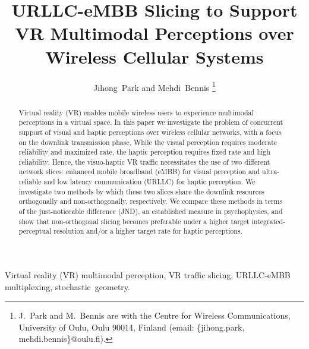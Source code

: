 \documentclass[conference]{IEEEtran}
\def\papertitle{URLLC-eMBB Slicing to Support VR Multimodal Perceptions over Wireless Cellular Systems}
\begin{document}
\title{ \fontsize{24}{28}\selectfont  \papertitle}

\author{Jihong~Park and Mehdi~Bennis
\thanks{J.~Park and M.~Bennis are with the Centre for Wireless Communications, University of Oulu, Oulu 90014, Finland (email: \{jihong.park, mehdi.bennis\}@oulu.fi). }
}

\maketitle \thispagestyle{empty}

\begin{abstract} Virtual reality (VR) enables mobile wireless users to experience multimodal perceptions in a virtual space. In this paper we investigate the problem of concurrent support of visual and haptic perceptions over wireless cellular networks, with a focus on the downlink transmission phase. While the visual perception requires moderate reliability and maximized rate, the haptic perception requires fixed rate and high reliability. Hence, the visuo-haptic VR traffic necessitates the use of two different network slices: enhanced mobile broadband (eMBB) for visual perception and ultra-reliable and low latency communication (URLLC) for haptic perception. We investigate two methods by which these two slices share the downlink resources orthogonally and non-orthogonally, respectively. We compare these methods in terms of the just-noticeable difference (JND), an established measure in psychophysics, and show that non-orthogonal slicing becomes preferable under a higher target integrated-perceptual resolution and/or a higher target rate for haptic perceptions.
\end{abstract}
\begin{IEEEkeywords} Virtual reality (VR) multimodal perception, VR traffic slicing, URLLC-eMBB multiplexing, stochastic~geometry.
\end{IEEEkeywords}

\end{document}
